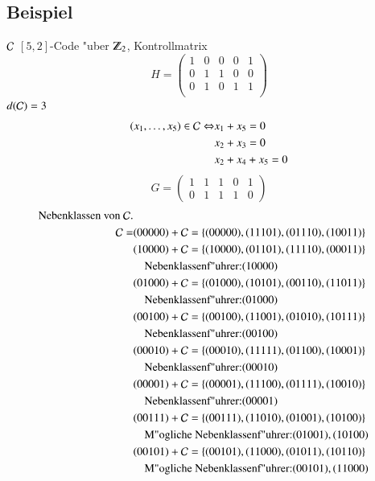 \subsection{Beispiel}
$\mathcal{C}$ $[5,2]$-Code "uber $\Z_2$, Kontrollmatrix
\[
	H=
	\begin{pmatrix}
		1 & 0 & 0 & 0 & 1\\
		0 & 1 & 1 & 0 & 0\\
		0 & 1 & 0 & 1 & 1\\
	\end{pmatrix}
\]
$d(\mathcal{C})=3$
\begin{align*}
(x_1,\ldots,x_5) \in \mathcal{C} \Leftrightarrow &x_1+x_5 = 0\\
& x_2+x_3=0\\
&x_2+x_4+x_5=0
\end{align*}
\[
	G=
	\begin{pmatrix}
		1 & 1 & 1 & 0 & 1\\
		0 & 1 & 1 & 1 &0
	\end{pmatrix}
\]
\begin{align*}
\text{Nebenklassen von } \mathcal{C}.\\
\mathcal{C} = &(00000) + \mathcal{C} = \lbrace (00000),(11101),(01110),(10011) \rbrace\\
					  &(10000) + \mathcal{C} = \lbrace (10000),(01101),(11110),(00011) \rbrace\\
					  &\quad \text{Nebenklassenf"uhrer:} (10000)\\
					  &(01000) + \mathcal{C} = \lbrace (01000),(10101),(00110),(11011) \rbrace\\
					  &\quad \text{Nebenklassenf"uhrer:} (01000)\\
					  &(00100) + \mathcal{C} = \lbrace (00100),(11001),(01010),(10111) \rbrace\\
					  &\quad \text{Nebenklassenf"uhrer:} (00100)\\
					  &(00010) + \mathcal{C} = \lbrace (00010),(11111),(01100),(10001) \rbrace\\
					  &\quad \text{Nebenklassenf"uhrer:} (00010)\\
					  &(00001) + \mathcal{C} = \lbrace (00001),(11100),(01111),(10010) \rbrace\\
					  &\quad \text{Nebenklassenf"uhrer:} (00001)\\
					  &(00111) + \mathcal{C} = \lbrace (00111),(11010),(01001),(10100) \rbrace\\
					  &\quad \text{M"ogliche Nebenklassenf"uhrer:} (01001), (10100)\\
					  &(00101) + \mathcal{C} = \lbrace (00101),(11000),(01011),(10110) \rbrace\\
					  &\quad \text{M"ogliche Nebenklassenf"uhrer:} (00101), (11000)\\
\end{align*}
